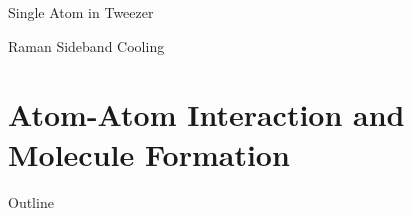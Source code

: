 \documentclass{beamer}
\begin{document}





\begin{frame}{Single Atom in Tweezer}
\end{frame}



\begin{frame}{Raman Sideband Cooling}
\end{frame}

\section{Atom-Atom Interaction and Molecule Formation}

\begin{frame}{Outline}
  \tableofcontents[currentsection]
\end{frame}


\end{document}
